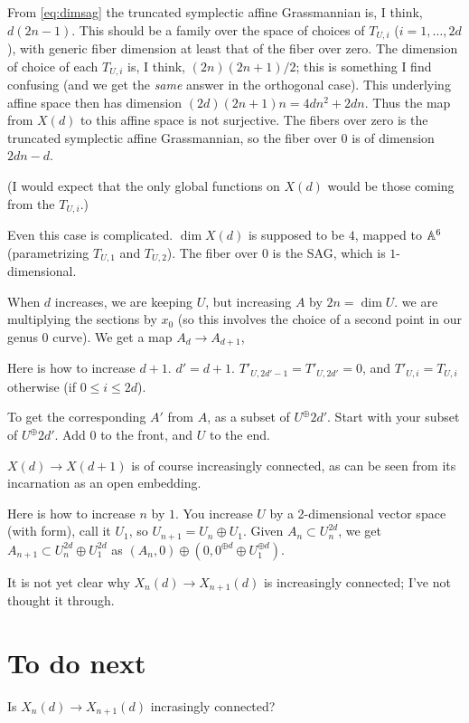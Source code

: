 {From \eqref{eq:dimsag} the truncated symplectic affine Grassmannian
is, I think, $d(2n-1)$.  This should be a  family over the space
of choices of $T_{U,i}$ ($i=1, \dots, 2d$), with generic fiber dimension
at least that of the fiber over zero.
The dimension of choice of each $T_{U,i}$ is, I think, $(2n)(2n+1)/2$; this is something
I find confusing (and we get the {\em same} answer in the orthogonal case).
This underlying affine
space then  has dimension $(2d)(2n+1)n = 4dn^2+2dn$.  Thus the map from $X(d)$ to this affine space is not surjective.  The fibers over zero is 
 the truncated symplectic affine
 Grassmannian, so the fiber over $0$ is of dimension $2dn-d$.

(I would expect that the only global functions on $X(d)$ would be those coming from the $T_{U,i}$.)


Even this case is complicated.  $\dim X(d)$ is supposed to be $4$,
mapped to $\mathbb{A}^6$ (parametrizing $T_{U,1}$ and $T_{U,2}$). The fiber
over $0$ is the SAG, which is $1$-dimensional.
 


When $d$ increases, we are keeping $U$, but increasing $A$ by $2n=\dim U$.
we are multiplying the sections by $x_0$ (so this involves the choice of a
second point in our genus $0$ curve).  We get a map $\boxed{A_d} \rightarrow \boxed{A_{d+1}}$,

Here is how to increase $d+1$.
$d'=d+1$.  $T'_{U,2d'-1}=T'_{U,2d'}=0$, and $T'_{U,i}= T_{U,i}$ otherwise (if $0 \leq i \leq 2d$).

To get the corresponding $A'$ from $A$, as a subset of $U^\oplus{2d'}$.
Start with your subset of $U^\oplus{2d'}$.  Add $0$ to the front, and $U$ to the end.

$X(d) \rightarrow X(d+1)$ is of course increasingly connected, as can be seen from its incarnation as an open embedding.

Here is how to increase $n$ by $1$.  You increase $U$ by a 2-dimensional vector space (with form), call it $U_1$, so $U_{n+1} = U_{n} \oplus U_1$.   Given $A_n \subset U_n^{2d}$, we get
$A_{n+1} \subset U_n^{2d} \oplus U_1^{2d}$ as $(A_n,0) \oplus (0, 0^{\oplus d} \oplus U_1^{\oplus d})$.

It is not yet clear why $X_n(d) \rightarrow X_{n+1}(d)$ is increasingly connected; I've not thought it through.


\section{To do next}


Is $X_n(d) \rightarrow X_{n+1}(d)$ incrasingly connected?


}  %


